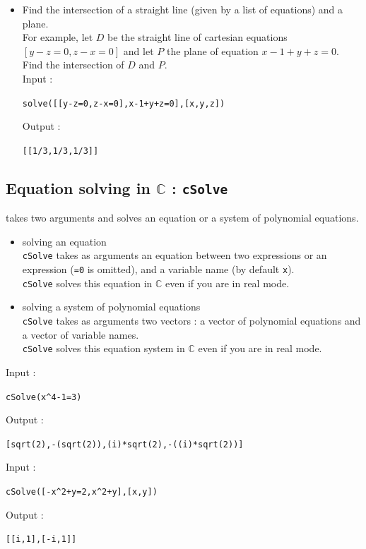 \documentclass[a4paper,11pt]{book}
\begin{document}
\begin{itemize}
Input :
\begin{center}{\tt  solve(cos(2*x)=1/2)}\end{center}
Output :
\begin{center}{\tt [pi/6,(-pi)/6]}\end{center}
Output with {\tt All\_trig\_sol} checked :
\begin{center}{\tt [(6*pi*n\_0+pi)/6,(6*pi*n\_0-pi)/6]}\end{center}
\item
Find the intersection of a straight line 
(given by a list of equations) and a plane.\\ For example,
let $D$ be the straight line of cartesian equations 
$[y-z=0,z-x=0]$ and let $P$ the plane of equation $x-1+y+z=0$.
Find the intersection of $D$ and $P$.\\
Input :
\begin{center}{\tt solve([[y-z=0,z-x=0],x-1+y+z=0],[x,y,z])}\end{center}
Output :
\begin{center}{\tt [[1/3,1/3,1/3]]}\end{center}
\end{itemize}

\subsection{Equation solving in $\mathbb C$ : {\tt cSolve}}
 takes two arguments and solves an equation or a system
of polynomial equations.
\begin{itemize}
\item solving an equation\\
{\tt cSolve} takes as arguments an equation between two expressions or an 
expression ({\tt =0} is omitted), and a variable name (by default {\tt x}).\\
{\tt cSolve} solves this equation in $\mathbb C$ even if you are in
real mode.
\item solving a system of polynomial equations\\
{\tt cSolve} takes as arguments two vectors : a vector of polynomial equations 
and a vector of variable names. \\
{\tt cSolve} solves this equation system in $\mathbb C$ even if you are in
real mode.
\end{itemize}
Input :
\begin{center}{\tt  cSolve(x\verb|^|4-1=3)}\end{center}
Output :
\begin{center}{\tt [sqrt(2),-(sqrt(2)),(i)*sqrt(2),-((i)*sqrt(2))]}\end{center}
Input :
\begin{center}{\tt  cSolve([-x\verb|^|2+y=2,x\verb|^|2+y],[x,y])}\end{center}
Output :
\begin{center}{\tt [[i,1],[-i,1]]}\end{center}
\end{document}
